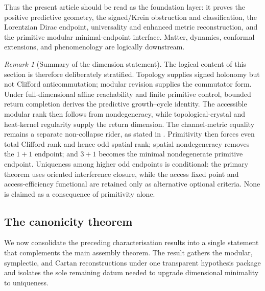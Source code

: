 \documentclass[11pt]{article}
\theoremstyle{definition}
\theoremstyle{remark}
\newtheorem{remark}[theorem]{Remark}
\begin{document}
Thus the present article should be read as the foundation layer: it proves the
positive predictive geometry, the signed/Krein obstruction and classification,
the Lorentzian Dirac endpoint, universality and enhanced metric reconstruction,
and the primitive modular minimal-endpoint interface.  Matter, dynamics,
conformal extensions, and phenomenology are logically downstream.


\begin{remark}[Summary of the dimension statement]
\label{rem:primitive-dimension-summary}
The logical content of this section is therefore deliberately stratified.
Topology supplies signed holonomy but not Clifford anticommutation; modular
revision supplies the commutator form.  Under full-dimensional affine
reachability and finite primitive control, bounded return completion derives the
predictive growth--cycle identity.  The accessible modular rank then follows
from nondegeneracy, while topological-crystal and heat-kernel regularity supply
the return dimension.  The channel-metric equality remains a separate
non-collapse rider, as stated in .  Primitivity then
forces even total Clifford rank and hence odd spatial rank; spatial
nondegeneracy removes the \(1+1\) endpoint; and \(3+1\) becomes the minimal
nondegenerate primitive endpoint.  Uniqueness among higher odd endpoints is conditional: the primary theorem uses
oriented interference closure, while the access fixed point and access-efficiency
functional are retained only as alternative optional criteria.  None is claimed
as a consequence of primitivity alone.
\end{remark}




\subsection{The canonicity theorem}
\label{sec:cxv}

We now consolidate the preceding characterisation results into a single
statement that complements the main assembly theorem.  The result gathers the
modular, symplectic, and Cartan reconstructions under one transparent hypothesis
package and isolates the sole remaining datum needed to upgrade dimensional
minimality to uniqueness.
\end{document}
